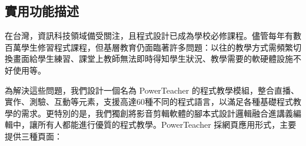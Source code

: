 \documentclass[12pt]{article}
\begin{document}
\subsection{實用功能描述}
\par 在台灣，資訊科技領域備受關注，且程式設計已成為學校必修課程。儘管每年有數百萬學生修習程式課程，但基層教育仍面臨著許多問題：以往的教學方式需頻繁切換畫面給學生練習、課堂上教師無法即時得知學生狀況、教學需要的軟硬體設施不好使用等。\\
\par 為解決這些問題，我們設計一個名為 PowerTeacher 的程式教學模組，整合直播、實作、測驗、互動等元素，支援高達60種不同的程式語言，以滿足各種基礎程式教學的需求。更特別的是，我們獨創將影音剪輯軟體的腳本式設計邏輯融合進講義編輯中，讓所有人都能進行優質的程式教學。PowerTeacher 採網頁應用形式，主要提供三種頁面：\\
\end{document}
